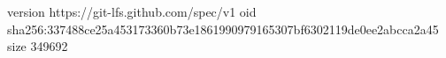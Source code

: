 version https://git-lfs.github.com/spec/v1
oid sha256:337488ce25a453173360b73e1861990979165307bf6302119de0ee2abcca2a45
size 349692
